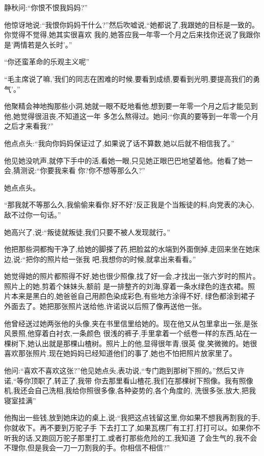 ﻿\documentclass[12pt]{article}
\begin{document}
静秋问:``你\myrule 恨不恨我妈妈?''

他惊讶地说:``我恨你妈妈干什么?''然后吹嘘说,``她都说了,我跟她的目标是一致的。你觉得不觉得,她其实很喜欢
我的,她答应我一年\myrule 零一个月之后来找你\myrule 还说了我跟你是'两情若是久长时'。''

``你\myrule 还蛮革命的乐观主义呢\myrule ''

``毛主席说了嘛,'我们的同志在困难的时候,要看到成绩,要看到光明,要提高我们的勇气'。''

他聚精会神地掏那些小洞,她就一眼不眨地看他,想到要一年零一个月之后才能见到他,她觉得很沮丧,不知道这一年
多怎么熬得过。她问:``你真的要等到一年零一个月之后才来\myrule 看我?''

他点点头:``我向你妈妈保证过了\myrule ,如果说了话不算数,她以后就不相信我了。''

他见她没吭声,就停下手中的活,看她一眼,只见她正眼巴巴地望着他。他看了她一会,猜测说:``你\myrule 要我来看
你?你不想等那么久?''

她点点头。

``那我就不等那么久,我偷偷来看你,好不好?反正我是个当叛徒的料,向党表的决心,敌不过你一句话。''

她高兴了,说:``叛徒就叛徒,我们只要不被人发现就行。''

他把那些洞都掏干净了,给她的脚搽了药,把脸盆的水端到外面倒掉,走回来坐在她床边,说:``把你的照片给一张我
吧,我\myrule 想你的时候,就拿出来看看。''

她觉得她的照片都照得不好,她也很少照像,找了好一会,才找出一张六岁时的照片。照片上的她,剪着个妹妹头,额前
是一排整齐的刘海,穿着一条水绿色的连衣裙。照片本来是黑白的,她爸爸自己用颜色染成彩色,有些地方涂得不好,
绿色都涂到裙子外面去了。她把那张照片送给他,许诺说以后照了像再送他一张。

他曾经送过她两张他的头像,夹在书里信里给她的。现在他又从包里拿出一张,是张风景照,他穿着白衬衣,一条颜色
很浅的裤子,手里拿着一个纸卷一样的东西,站在一棵树下,她认出就是那棵山楂树。照片上的他,显得很年青,很英
俊,笑微微的。她很喜欢那张照片,现在她妈妈已经知道他们的事了,她也不怕把照片放家里了。

他问:``喜欢不喜欢这张?''他见她点头,表功说,``专门跑到那树下照的。''然后又许诺,``等你顶职了,转正了,我带
你去那里看山楂花,我们在那棵树下照像。我有照像机,我还会自己洗相,我给你照很多像,各种姿势的,各个角度的,
洗很多张,放大,把我寝室挂满\myrule ''

他掏出一些钱,放到她床边的桌上,说:``我把这点钱留这里,你如果不想我再割我的手,你就收下。再不要到万驼子手
下去打工了,如果瓦楞厂有工打,打打可以。如果你不听我的话,又跑回万驼子那里打工,或者打那些危险的工,我知道
了会生气的,我不会不理你,但是我会一刀一刀割我的手。你相信不相信?''
\end{document}

